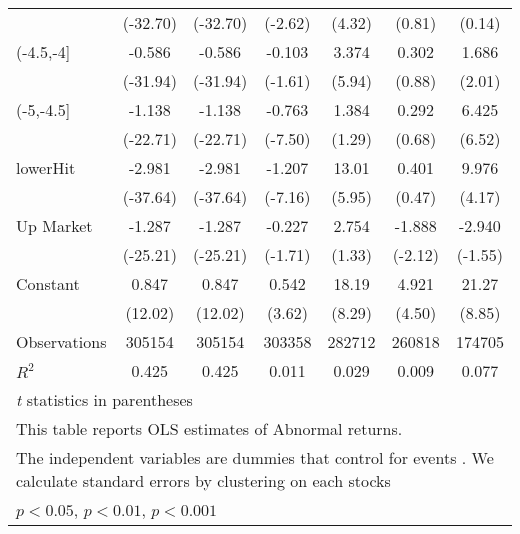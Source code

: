 {\begin{tabular}{l*{6}{c}}
                    &    (-32.70)         &    (-32.70)         &     (-2.62)         &      (4.32)         &      (0.81)         &      (0.14)         \\
[1em]
(-4.5,-4]           &      -0.586\sym{***}&      -0.586\sym{***}&      -0.103         &       3.374\sym{***}&       0.302         &       1.686\sym{*}  \\
                    &    (-31.94)         &    (-31.94)         &     (-1.61)         &      (5.94)         &      (0.88)         &      (2.01)         \\
[1em]
(-5,-4.5]           &      -1.138\sym{***}&      -1.138\sym{***}&      -0.763\sym{***}&       1.384         &       0.292         &       6.425\sym{***}\\
                    &    (-22.71)         &    (-22.71)         &     (-7.50)         &      (1.29)         &      (0.68)         &      (6.52)         \\
[1em]
lowerHit            &      -2.981\sym{***}&      -2.981\sym{***}&      -1.207\sym{***}&       13.01\sym{***}&       0.401         &       9.976\sym{***}\\
                    &    (-37.64)         &    (-37.64)         &     (-7.16)         &      (5.95)         &      (0.47)         &      (4.17)         \\
[1em]
Up Market           &      -1.287\sym{***}&      -1.287\sym{***}&      -0.227         &       2.754         &      -1.888\sym{*}  &      -2.940         \\
                    &    (-25.21)         &    (-25.21)         &     (-1.71)         &      (1.33)         &     (-2.12)         &     (-1.55)         \\
[1em]
Constant            &       0.847\sym{***}&       0.847\sym{***}&       0.542\sym{***}&       18.19\sym{***}&       4.921\sym{***}&       21.27\sym{***}\\
                    &     (12.02)         &     (12.02)         &      (3.62)         &      (8.29)         &      (4.50)         &      (8.85)         \\
\hline
Observations        &      305154         &      305154         &      303358         &      282712         &      260818         &      174705         \\
\(R^{2}\)           &       0.425         &       0.425         &       0.011         &       0.029         &       0.009         &       0.077         \\
\hline\hline
\multicolumn{7}{l}{\footnotesize \textit{t} statistics in parentheses}\\
\multicolumn{7}{l}{\footnotesize This table reports OLS estimates of Abnormal returns.}\\
\multicolumn{7}{l}{\footnotesize The independent variables are dummies that control for events . We calculate standard errors by clustering on each stocks}\\
\multicolumn{7}{l}{\footnotesize \sym{*} \(p<0.05\), \sym{**} \(p<0.01\), \sym{***} \(p<0.001\)}\\
\end{tabular}
}
